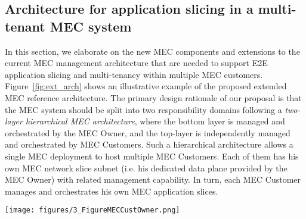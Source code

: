 \subsection{Architecture for application slicing in a multi-tenant MEC system}
\label{subsec:new_MEC_arch}
\noindent
%
In this section, we elaborate on the new MEC components and extensions to the current MEC management architecture that are needed to support E2E application slicing and multi-tenancy within multiple MEC customers. Figure~\ref{fig:ext_arch} shows an illustrative example of the proposed extended MEC reference architecture. The primary design rationale of our proposal is that the MEC system should be split into two responsibility domains following a \textit{two-layer hierarchical MEC architecture}, where the bottom layer is managed and orchestrated by the MEC Owner, and the top-layer is independently managed and orchestrated by MEC Customers. Such a hierarchical architecture allows a single MEC deployment to host multiple MEC Customers. Each of them has his own MEC network slice subnet (i.e. his dedicated data plane provided by the MEC Owner) with related management capability. In turn, each MEC Customer manages and orchestrates his own MEC application slices. 
%
\begin{figure*}[ht]
\centering
\texttt{[image: figures/3\_FigureMECCustOwner.png]}
\caption{Multi-tenant MEC architecture supporting network and application slicing}
\label{fig:ext_arch}
\vspace{-0.2cm}
\end{figure*}
%

